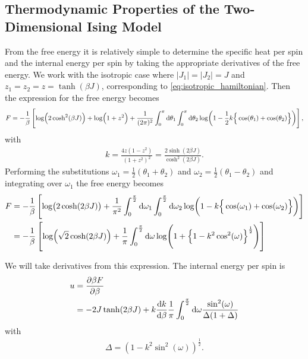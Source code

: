 \documentclass[11pt, a4paper]{report} %
\begin{document}
\subsection{Thermodynamic Properties of the Two-Dimensional Ising Model}
From the free energy it is relatively simple to determine the specific heat per spin and the internal energy per spin by taking the appropriate derivatives of the free energy\cite{mccoy:1973}. We work with the isotropic case where \(\left|J_1\right| = \left|J_2\right| = J\) and \(z_1 = z_2 = z = \tanh(\beta J)\), corresponding to \cref{eq:isotropic_hamiltonian}.
Then the expression for the free energy becomes
\begin{dmath}
	F = -\frac{1}{\beta} \left[\log(2\cosh^2(\beta J)) + \log(1+z^2) + \frac{1}{(2\pi)^2} \int_0^{\pi}\dif \theta_1 \int_0^{\pi} \dif \theta_2 \log(1-\frac{1}{2}k \Big\{\cos(\theta_1) + \cos(\theta_2)\Big\})\right],
\end{dmath}
with
\begin{align}
	k = \frac{4z(1-z^2)}{(1+z^2)^2} = \frac{2\sinh(2\beta J)}{\cosh^2{(2\beta J)}}.
\end{align}
Performing the substitutions \(\omega_1 = \frac{1}{2}(\theta_1 + \theta_2)\) and \(\omega_2 = \frac{1}{2}(\theta_1 - \theta_2)\) and integrating over \(\omega_1\) the free energy becomes
\begin{align}
		F &= -\frac{1}{\beta} \left[\log(2\cosh(2\beta J)) + \frac{1}{\pi^2} \int_0^{\frac{\pi}{2}} \dif \omega_1 \int_0^{\frac{\pi}{2}} \dif \omega_2 \log(1- k \Big\{\cos(\omega_1) + \cos(\omega_2)\Big\})\right]\\
		&= -\frac{1}{\beta} \left[\log(\sqrt{2}\cosh(2\beta J)) + \frac{1}{\pi} \int_0^{\frac{\pi}{2}} \dif \omega \log(1+\left\{1-k^2 \cos^2(\omega)\right\}^{\frac{1}{2}}) \right]
\end{align}

We will take derivatives from this expression. The internal energy per spin is
\begin{align}
	\label{eq:internal_energy}
	u &= \frac{\partial \beta F}{\partial \beta}\\
	&= -2 J \tanh(2\beta J) + k \frac{\dif k}{\dif \beta} \frac{1}{\pi} \int_0^{\frac{\pi}{2}} \dif \omega \frac{\sin^2(\omega)}{\Delta (1+\Delta)}
\end{align}
with
\begin{align}
	\Delta = \left( 1 - k^2 \sin^2(\omega) \right)^{\frac{1}{2}}.
\end{align}
\end{document}
